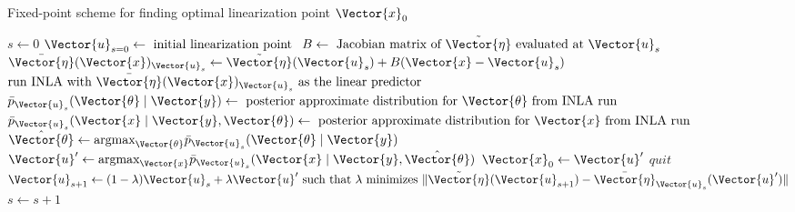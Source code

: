 \begin{algorithm}[h!]
    \caption{Fixed-point scheme for finding optimal linearization point $\Vector{x}_0$}
    \label{alg:inlabru-fpi}
    \begin{algorithmic}
    \State $s \gets 0$
    \State $\Vector{u}_{s = 0} \gets \text{ initial linearization point }$
        \State $B \gets \text{ Jacobian matrix of } \tilde{\Vector{\eta}} \text{ evaluated at } \Vector{u}_s$
        \State $ \bar{\Vector{\eta}}(\Vector{x})_{\Vector{u}_s} \gets \tilde{\Vector{\eta}}(\Vector{u}_s) + B(\Vector{x} - \Vector{u}_s)$
        \State $\text{run INLA with }\bar{\Vector{\eta}}(\Vector{x})_{\Vector{u}_s} \text{ as the linear predictor}$
        \State $\bar{p}_{\Vector{u}_s}(\Vector{\theta}\mid \Vector{y}) \gets \text{ posterior approximate distribution for $\Vector{\theta}$ from INLA run}$
        \State $\bar{p}_{\Vector{u}_s}(\Vector{x}\mid \Vector{y}, \Vector{\theta}) \gets \text{ posterior approximate distribution for $\Vector{x}$ from INLA run}$
        \State $\hat{\Vector{\theta}} \gets \text{argmax}_{\Vector{\theta}} \bar{p}_{\Vector{u}_s}(\Vector{\theta}\mid \Vector{y}) $
        \State $\Vector{u}' \gets \text{argmax}_{\Vector{x}} \bar{p}_{\Vector{u}_s}(\Vector{x}\mid \Vector{y}, \hat{\Vector{\theta}})$
            \State $\Vector{x}_0 \gets \Vector{u}'$
            \State $quit$
        \Else
            \State $\Vector{u}_{s+1} \gets (1 - \lambda)\Vector{u}_s + \lambda \Vector{u}' \text{ such that } \lambda \text{ minimizes } \lVert \tilde{\Vector{\eta}}(\Vector{u}_{s+1}) - \bar{\Vector{\eta}}_{\Vector{u}_s}(\Vector{u}') \rVert$
            \State $s \gets s + 1$
        \EndIf
    \EndWhile
    \end{algorithmic}
\end{algorithm}




